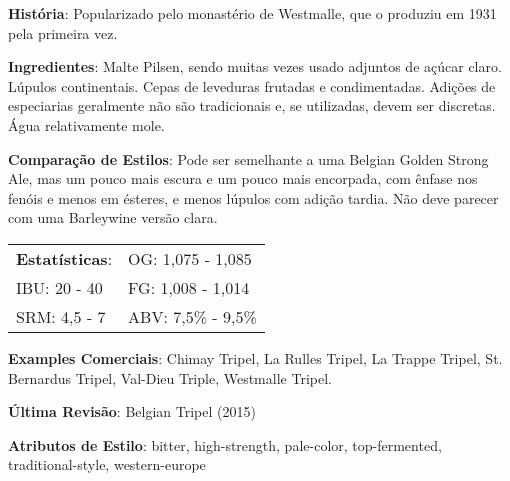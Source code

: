 \textbf{História}: Popularizado pelo monastério de Westmalle, que o produziu em 1931 pela primeira vez.

\textbf{Ingredientes}: Malte Pilsen, sendo muitas vezes usado adjuntos de açúcar claro. Lúpulos continentais. Cepas de leveduras frutadas e condimentadas. Adições de especiarias geralmente não são tradicionais e, se utilizadas, devem ser discretas. Água relativamente mole.

\textbf{Comparação de Estilos}: Pode ser semelhante a uma Belgian Golden Strong Ale, mas um pouco mais escura e um pouco mais encorpada, com ênfase nos fenóis e menos em ésteres, e menos lúpulos com adição tardia. Não deve parecer com uma Barleywine versão clara.

\begin{tabular}{@{}p{35mm}p{35mm}@{}}
  \textbf{Estatísticas}: & OG: 1,075 - 1,085 \\
  IBU: 20 - 40  & FG: 1,008 - 1,014  \\
  SRM: 4,5 - 7  & ABV: 7,5\% - 9,5\%
\end{tabular}

\textbf{Examples Comerciais}: Chimay Tripel, La Rulles Tripel, La Trappe Tripel, St. Bernardus Tripel, Val-Dieu Triple, Westmalle Tripel.

\textbf{Última Revisão}: Belgian Tripel (2015)

\textbf{Atributos de Estilo}: bitter, high-strength, pale-color, top-fermented, traditional-style, western-europe
